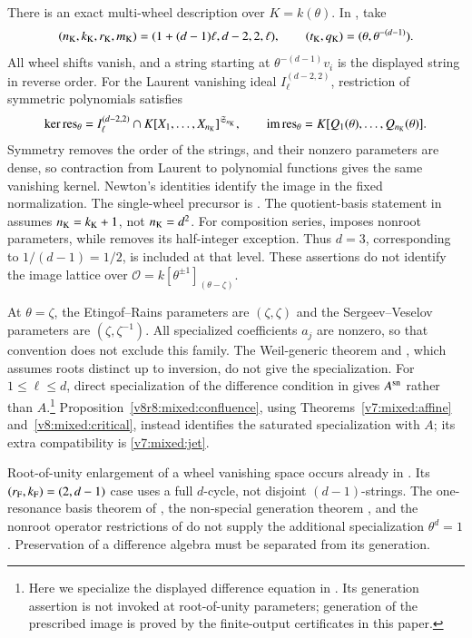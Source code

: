 \documentclass[10pt,fleqn]{article}
\numberwithin{equation}{section}
\begin{document}
There is an exact multi-wheel description over $K=k(\theta)$.
In \cite[Definition~6.1, arXiv version]{KasataniMultiwheel}, take
\[
 (n_{\rm K},k_{\rm K},r_{\rm K},m_{\rm K})
   =(1+(d-1)\ell,d-2,2,\ell),\qquad
 (t_{\rm K},q_{\rm K})=(\theta,\theta^{-(d-1)}).
\]
All wheel shifts vanish, and a string starting at $\theta^{-(d-1)}v_i$
is the displayed string in reverse order.  For the Laurent vanishing
ideal $I^{(d-2,2)}_\ell$, restriction of symmetric polynomials satisfies
\[
 \ker\operatorname{res}_\theta
   =I^{(d-2,2)}_\ell\cap K[X_1,\ldots,X_{n_{\rm K}}]^{\mathfrak S_{n_{\rm K}}},
 \qquad \operatorname{im}\operatorname{res}_\theta
   =K[Q_1(\theta),\ldots,Q_{n_{\rm K}}(\theta)].
\]
Symmetry removes the order of the strings, and their nonzero parameters
are dense, so contraction from Laurent to polynomial functions gives
the same vanishing kernel.  Newton's identities identify the image in
the fixed normalization.  The single-wheel precursor is
\cite[Theorem~2.4]{FJMMShifted}.
The quotient-basis statement in \cite[Theorem~6.5]{KasataniMultiwheel}
assumes $n_{\rm K}=k_{\rm K}+1$, not $n_{\rm K}=d^2$.
For composition series, \cite[Section~2.1.4]{EnomotoDAHA} imposes nonroot
parameters, while \cite[Section~5.2, Theorem~5.10]{EtingofStoica} removes
its half-integer exception.  Thus $d=3$, corresponding to $1/(d-1)=1/2$,
is included at that level.  These assertions do not identify the image
lattice over $\mathcal O=k[\theta^{\pm1}]_{(\theta-\zeta)}$.

At $\theta=\zeta$, the Etingof--Rains parameters are $(\zeta,\zeta)$ and
the Sergeev--Veselov parameters are $(\zeta,\zeta^{-1})$.
All specialized coefficients $a_j$ are nonzero, so that convention does
not exclude this family.  The Weil-generic theorem and
\cite[Remark~2.6]{EtingofRains}, which assumes roots distinct up to
inversion, do not give the specialization.
For $1\le\ell\le d$, direct specialization of the difference condition in
\cite[Proposition~3.5(i)]{EtingofRains} gives $A^{\rm sn}$ rather than
$A$.\footnote{Here we specialize the displayed difference equation in
\cite[Proposition~3.5(i), arXiv and accepted-manuscript versions]{EtingofRains}.
Its generation assertion is not invoked at root-of-unity parameters;
generation of the prescribed image is proved by the finite-output
certificates in this paper.}
Proposition~\ref{v8r8:mixed:confluence}, using
Theorems~\ref{v7:mixed:affine} and~\ref{v8:mixed:critical}, instead
identifies the saturated specialization with $A$; its extra compatibility
is \eqref{v7:mixed:jet}.

Root-of-unity enlargement of a wheel vanishing space occurs already in
\cite[Section~3.1]{FJMMTUnity}.  Its $(r_{\rm F},k_{\rm F})=(2,d-1)$
case uses a full $d$-cycle, not disjoint $(d-1)$-strings.
The one-resonance basis theorem of
\cite[Section~2, equation~(2.10)]{FJMMShifted}, the non-special generation
theorem \cite[Theorem~5.8]{SergeevVeselovMR}, and the nonroot operator
restrictions of \cite[Sections~3.2--3.4]{HLNR} do not supply the additional
specialization $\theta^d=1$.  Preservation of a difference algebra must
be separated from its generation.
\end{document}
